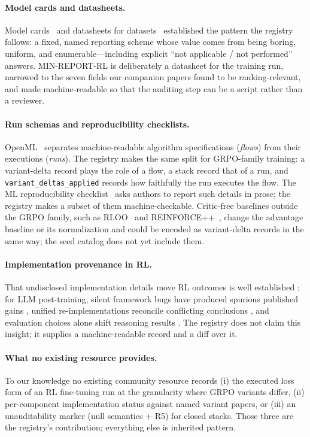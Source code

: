 \paragraph{Model cards and datasheets.}
Model cards~\citep{mitchell2019modelcards} and datasheets for
datasets~\citep{gebru2021datasheets} established the pattern the registry
follows: a fixed, named reporting scheme whose value comes from being boring,
uniform, and enumerable---including explicit ``not applicable / not
performed'' answers. MIN-REPORT-RL is deliberately a datasheet for the
training run, narrowed to the seven fields our companion papers found
to be ranking-relevant, and made machine-readable so that the auditing step
can be a script rather than a reviewer.

\paragraph{Run schemas and reproducibility checklists.}
OpenML~\citep{vanschoren2014openml} separates machine-readable algorithm
specifications (\emph{flows}) from their executions (\emph{runs}). The
registry makes the same split for GRPO-family training: a variant-delta
record plays the role of a flow, a stack record that of a run, and
\texttt{variant\_deltas\_applied} records how faithfully the run executes the
flow. The ML reproducibility checklist~\citep{pineau2020improving} asks
authors to report such details in prose; the registry makes a subset of them
machine-checkable. Critic-free baselines outside the GRPO family, such as
RLOO~\citep{ahmadian2024backtobasics} and
REINFORCE++~\citep{hu2025reinforcepp}, change the advantage baseline or its
normalization and could be encoded as variant-delta records in the same
way; the seed catalog does not yet include them.

\paragraph{Implementation provenance in RL.} That undisclosed implementation
details move RL outcomes is well established
\citep{henderson2018deep, engstrom2020implementation}; for LLM post-training,
silent framework bugs have produced spurious published gains
\citep{limozin2026sftrl}, unified re-implementations reconcile conflicting
conclusions \citep{liu2025tricks}, and evaluation choices alone shift
reasoning results \citep{hochlehnert2025sober}. The registry does not claim
this insight; it supplies a machine-readable record and a diff over it.

\paragraph{What no existing resource provides.}
To our knowledge no existing community resource records (i) the executed loss
form of an RL fine-tuning run at the granularity where GRPO variants differ,
(ii) per-component implementation status against named variant papers, or
(iii) an unauditability marker (null semantics + R5) for closed stacks. Those
three are the registry's contribution; everything else is inherited pattern.
